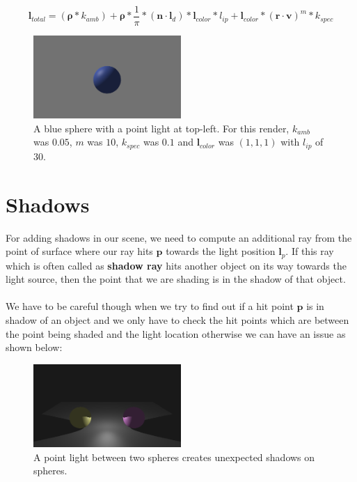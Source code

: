 \documentclass[11pt,a4paper]{article}
\begin{document}
	\begin{equation}
	\boldsymbol{l}_{total} = (\boldsymbol{\rho} * k_{amb}) + \boldsymbol{\rho} * \frac{1}{\pi} * (\boldsymbol{n} \cdot \boldsymbol{l}_{d}) * \boldsymbol{l}_{color} * l_{ip} + \boldsymbol{l}_{color} * (\boldsymbol{r} \cdot \boldsymbol{v})^m * k_{spec}
	\end{equation}
	\begin{figure}[H]
		\centering
		\captionsetup{justification=centering}
		\includegraphics[width=0.5\textwidth]{diffuse_ambient_specular_reflection}\quad
		\caption{A blue sphere with a point light at top-left. For this render, $k_{amb}$ was $0.05$, $m$ was $10$, $k_{spec}$ was $0.1$ and $\boldsymbol{l}_{color}$ was $(1, 1, 1)$ with $l_{ip}$ of 30.}
	\end{figure}

	\section{Shadows}
	
	For adding shadows in our scene, we need to compute an additional ray from the point of surface where our ray hits $\boldsymbol{p}$ towards the light position $\boldsymbol{l}_{p}$. If this ray which is often called as \textbf{shadow ray} hits another object on its way towards the light source, then the point that we are shading is in the shadow of that object. \\~\\We have to be careful though when we try to find out if a hit point $\boldsymbol{p}$ is in shadow of an object and we only have to check the hit points which are between the point being shaded and the light location otherwise we can have an issue as shown below: 
	
	\begin{figure}[H]
		\centering
		\captionsetup{justification=centering}
		\includegraphics[width=0.5\textwidth]{shadow_ray_problem.png}\quad
		\caption{A point light between two spheres creates unexpected shadows on spheres.}
	\end{figure}
	
\end{document}
